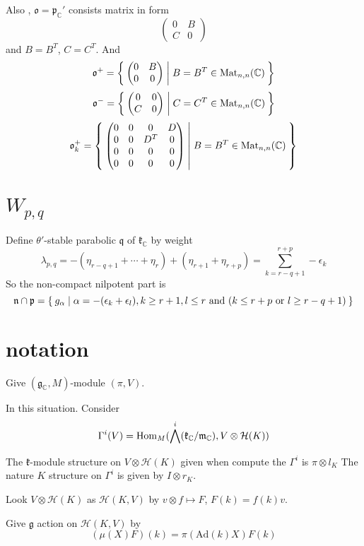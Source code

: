 \documentclass[12pt]{article}
\def\Hom{{\rm Hom}}
\def\Mat{{\rm Mat}}
\def\bC{{\mathbb{C}}}
\def\Ad{{\rm Ad}}
\def\Ad{\mathrm{Ad}}
\def\fnn{\mathfrak{n}}
\def\foo{\mathfrak{o}}
\def\fpp{\mathfrak{p}}
\def\fqq{\mathfrak{q}}
\def\fgg{\mathfrak{g}}
\def\fkk{\mathfrak{k}}
\def\chh{\mathcal{H}}
\def\fmm{\mathfrak{m}}
\def\Mat{\mathrm{Mat}}
\begin{document}
Also , $\foo = \fpp_\bC'$ consists matrix in form 
\[
\begin{pmatrix}
0 &  B \\
C & 0 
\end{pmatrix}
\]
and $B= B^T$, $C= C^T$.
And 
\[
\foo^+ = \Set{\begin{pmatrix}
0 &  B \\
0 & 0 
\end{pmatrix}
| B = B^T \in \Mat_{n,n}(\bC)
}
\]
\[
\foo^- = \Set{\begin{pmatrix}
0 &  0 \\
C & 0 
\end{pmatrix}
| C = C^T \in \Mat_{n,n}(\bC)
}
\]
\[
\foo_k^+ =  \Set{\begin{pmatrix}
0 &  0 &  0 &D \\
0 & 0  & D^T & 0 \\
0 & 0 & 0 & 0 \\
0 & 0 & 0 & 0 
\end{pmatrix}
| B = B^T \in \Mat_{n,n}(\bC)}
\]




\section{$W_{p,q}$}
Define $\theta'$-stable parabolic $\fqq$ of $\fkk_\bC$ by weight
\[
\lambda_{p,q} = -(\eta_{r-q+1} +  \cdots + \eta_r)+(\eta_{r+1} + \eta_{r+p})
 = \sum_{k=r-q+1}^{r+p} - \epsilon_{k}
\]
So the non-compact nilpotent part is 
\[
\fnn\cap \fpp = \Set{g_{\alpha}|\alpha = -(\epsilon_k+\epsilon_l), 
  k\geq r+1, l \leq r
  \text{ and } (
  k \leq r+p \text{ or } l \geq r-q+1)
}
\]

\section{notation}



Give $(\fgg_\bC, M)$-module $(\pi, V)$.

In this situation. 
Consider 
\[
\Gamma^i (V) = \Hom_{M}(\bigwedge^i(\fkk_\bC/\fmm_\bC), V\otimes \chh(K))
\]


The $\fkk$-module structure on $V\otimes \chh(K)$ given when compute the
$\Gamma^i$ is $\pi\otimes l_K$
The nature $K$ structure on $\Gamma^i$ is given by $I\otimes r_K$.

Look $V\otimes \chh(K)$ as $\chh(K, V)$ by $v\otimes f \mapsto F$, 
$F(k) = f(k)v$. 
 
Give $\fgg$ action on $\chh(K,V)$ by 
\[
(\mu(X)F)(k) = \pi(\Ad(k) X) F(k)
\]
\end{document}
